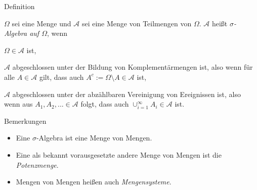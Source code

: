 \documentclass[
  8pt,
  ignorenonframetext,
]{beamer}
\providecommand{\tightlist}{%
  \setlength{\itemsep}{0pt}\setlength{\parskip}{0pt}}
\begin{document}
\begin{frame}{Definition}
\protect\hypertarget{definition-1}{}
\small
\begin{definition}
\justifying
$\Omega$ sei eine Menge und $\mathcal{A}$ sei eine Menge von Teilmengen von $\Omega$.
$\mathcal{A}$ heißt \textit{$\sigma$-Algebra auf $\Omega$}, wenn
\begin{itemize}
\begin{small}
\item $\Omega \in \mathcal{A}$ ist,
\item $\mathcal{A}$ abgeschlossen unter der Bildung von Komplementärmengen ist, 
    also wenn für alle $A\in \mathcal{A}$ gilt, dass auch $A^c := \Omega \setminus A \in \mathcal{A}$ ist, 
\item $\mathcal{A}$ abgeschlossen unter der abzählbaren Vereinigung von Ereignissen ist, also wenn aus  
    $A_1,A_2,... \in \mathcal{A}$ folgt, dass auch $\cup_{i=1}^\infty A_i \in \mathcal{A}$ ist.  
\end{small}
\end{itemize}
\end{definition}

Bemerkungen

\begin{itemize}
\tightlist
\item
  Eine \(\sigma\)-Algebra ist eine Menge von Mengen.
\item
  Eine als bekannt vorausgesetzte andere Menge von Mengen ist die
  \emph{Potenzmenge}.
\item
  Mengen von Mengen heißen auch \emph{Mengensysteme}.
\end{itemize}
\end{frame}
\end{document}
